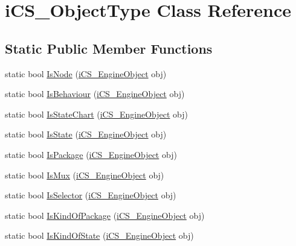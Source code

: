 \hypertarget{classi_c_s___object_type}{\section{i\+C\+S\+\_\+\+Object\+Type Class Reference}
\label{classi_c_s___object_type}
}
\subsection*{Static Public Member Functions}
\begin{DoxyCompactItemize}
\item 
static bool \hyperlink{classi_c_s___object_type_a851a557cad8e8d3ca8f770b90a314dbb}{Is\+Node} (\hyperlink{classi_c_s___engine_object}{i\+C\+S\+\_\+\+Engine\+Object} obj)
\item 
static bool \hyperlink{classi_c_s___object_type_a86407f23ef5fab3050099e59c31b559d}{Is\+Behaviour} (\hyperlink{classi_c_s___engine_object}{i\+C\+S\+\_\+\+Engine\+Object} obj)
\item 
static bool \hyperlink{classi_c_s___object_type_a5850ec955a9705f8a89f5eec7faecd69}{Is\+State\+Chart} (\hyperlink{classi_c_s___engine_object}{i\+C\+S\+\_\+\+Engine\+Object} obj)
\item 
static bool \hyperlink{classi_c_s___object_type_a72a1bc4dac9ca5eaeeffc392a3054703}{Is\+State} (\hyperlink{classi_c_s___engine_object}{i\+C\+S\+\_\+\+Engine\+Object} obj)
\item 
static bool \hyperlink{classi_c_s___object_type_a4794b23f90de20e7fe0e811e72714c68}{Is\+Package} (\hyperlink{classi_c_s___engine_object}{i\+C\+S\+\_\+\+Engine\+Object} obj)
\item 
static bool \hyperlink{classi_c_s___object_type_ad06eae31d86213e7213935b835b86800}{Is\+Mux} (\hyperlink{classi_c_s___engine_object}{i\+C\+S\+\_\+\+Engine\+Object} obj)
\item 
static bool \hyperlink{classi_c_s___object_type_ac78f2b70341eeb3ac657fde22cc633e5}{Is\+Selector} (\hyperlink{classi_c_s___engine_object}{i\+C\+S\+\_\+\+Engine\+Object} obj)
\item 
static bool \hyperlink{classi_c_s___object_type_a7067ff1dd9bedebc2d7893a04e1f1467}{Is\+Kind\+Of\+Package} (\hyperlink{classi_c_s___engine_object}{i\+C\+S\+\_\+\+Engine\+Object} obj)
\item 
static bool \hyperlink{classi_c_s___object_type_a2b590934768aa16b15734746b05c19fc}{Is\+Kind\+Of\+State} (\hyperlink{classi_c_s___engine_object}{i\+C\+S\+\_\+\+Engine\+Object} obj)

\end{DoxyCompactItemize}
